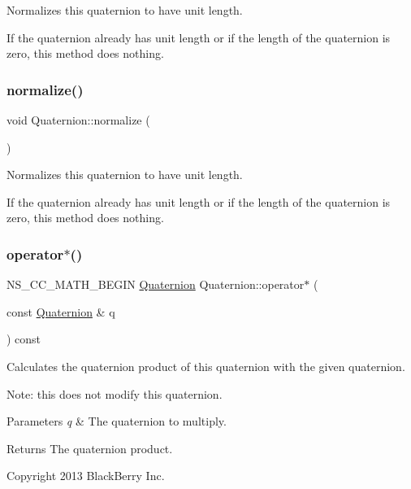 Normalizes this quaternion to have unit length.

If the quaternion already has unit length or if the length of the quaternion is zero, this method does nothing. \mbox{\label{classQuaternion_a48e6bafb249c895ed25f29dc9170e11e}} 
\subsubsection{\texorpdfstring{normalize()}{normalize()}\hspace{0.1cm}{\footnotesize\ttfamily [2/2]}}
{\footnotesize\ttfamily void Quaternion\+::normalize (\begin{DoxyParamCaption}{ }\end{DoxyParamCaption})}

Normalizes this quaternion to have unit length.

If the quaternion already has unit length or if the length of the quaternion is zero, this method does nothing. \mbox{\label{classQuaternion_ae1144820c2f61dc0c8ee33060600ca7e}} 
\subsubsection{\texorpdfstring{operator$\ast$()}{operator*()}\hspace{0.1cm}{\footnotesize\ttfamily [1/4]}}
{\footnotesize\ttfamily N\+S\+\_\+\+C\+C\+\_\+\+M\+A\+T\+H\+\_\+\+B\+E\+G\+IN \hyperlink{classQuaternion}{Quaternion} Quaternion\+::operator$\ast$ (\begin{DoxyParamCaption}\item[{const \hyperlink{classQuaternion}{Quaternion} \&}]{q }\end{DoxyParamCaption}) const\hspace{0.3cm}{\ttfamily [inline]}}

Calculates the quaternion product of this quaternion with the given quaternion.

Note\+: this does not modify this quaternion.


\begin{DoxyParams}{Parameters}
{\em q} & The quaternion to multiply. \\
\hline
\end{DoxyParams}
\begin{DoxyReturn}{Returns}
The quaternion product.
\end{DoxyReturn}
Copyright 2013 Black\+Berry Inc.

